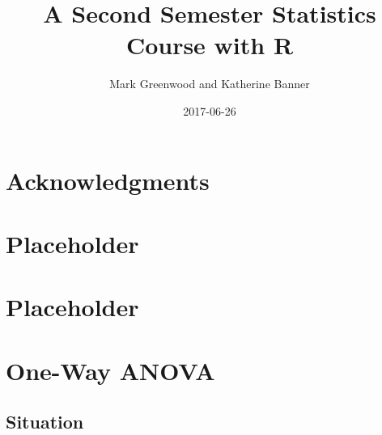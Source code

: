 \documentclass[]{book}
\title{A Second Semester Statistics Course with R}
\author{Mark Greenwood and Katherine Banner}
\date{2017-06-26}
\begin{document}
\maketitle

{
\setcounter{tocdepth}{1}
\tableofcontents
}
\chapter*{Acknowledgments}\label{acknowledgments}

\chapter{Placeholder}\label{placeholder}

\chapter{Placeholder}\label{placeholder-1}

\chapter{One-Way ANOVA}\label{chapter3}

\section{Situation}\label{section3-1}
\end{document}
